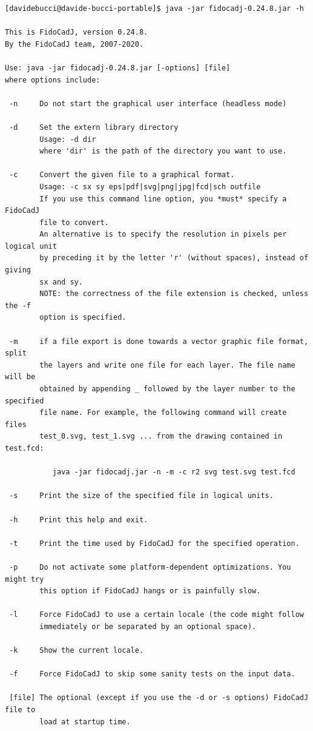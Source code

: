 \documentclass[10pt,a4paper,twoside]{scrreprt}
\begin{document}
\begin{lstlisting}
[davidebucci@davide-bucci-portable]$ java -jar fidocadj-0.24.8.jar -h

This is FidoCadJ, version 0.24.8.
By the FidoCadJ team, 2007-2020.

Use: java -jar fidocadj-0.24.8.jar [-options] [file]
where options include:

 -n     Do not start the graphical user interface (headless mode)

 -d     Set the extern library directory
        Usage: -d dir
        where 'dir' is the path of the directory you want to use.

 -c     Convert the given file to a graphical format.
        Usage: -c sx sy eps|pdf|svg|png|jpg|fcd|sch outfile
        If you use this command line option, you *must* specify a FidoCadJ
        file to convert.
        An alternative is to specify the resolution in pixels per logical unit
        by preceding it by the letter 'r' (without spaces), instead of giving
        sx and sy.
        NOTE: the correctness of the file extension is checked, unless the -f
        option is specified.

 -m     if a file export is done towards a vector graphic file format, split
        the layers and write one file for each layer. The file name will be
        obtained by appending _ followed by the layer number to the specified
        file name. For example, the following command will create files
        test_0.svg, test_1.svg ... from the drawing contained in test.fcd:

           java -jar fidocadj.jar -n -m -c r2 svg test.svg test.fcd

 -s     Print the size of the specified file in logical units.

 -h     Print this help and exit.

 -t     Print the time used by FidoCadJ for the specified operation.

 -p     Do not activate some platform-dependent optimizations. You might try
        this option if FidoCadJ hangs or is painfully slow.

 -l     Force FidoCadJ to use a certain locale (the code might follow
        immediately or be separated by an optional space).

 -k     Show the current locale.

 -f     Force FidoCadJ to skip some sanity tests on the input data.

 [file] The optional (except if you use the -d or -s options) FidoCadJ file to
        load at startup time.


\end{lstlisting}
\end{document}
